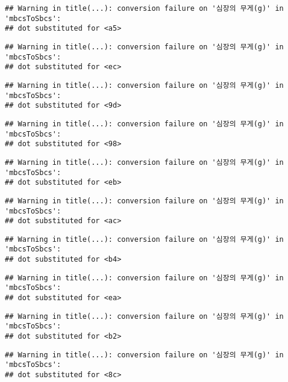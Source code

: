 \documentclass[
]{article}
\begin{document}
\begin{verbatim}
## Warning in title(...): conversion failure on '심장의 무게(g)' in 'mbcsToSbcs':
## dot substituted for <a5>
\end{verbatim}

\begin{verbatim}
## Warning in title(...): conversion failure on '심장의 무게(g)' in 'mbcsToSbcs':
## dot substituted for <ec>
\end{verbatim}

\begin{verbatim}
## Warning in title(...): conversion failure on '심장의 무게(g)' in 'mbcsToSbcs':
## dot substituted for <9d>
\end{verbatim}

\begin{verbatim}
## Warning in title(...): conversion failure on '심장의 무게(g)' in 'mbcsToSbcs':
## dot substituted for <98>
\end{verbatim}

\begin{verbatim}
## Warning in title(...): conversion failure on '심장의 무게(g)' in 'mbcsToSbcs':
## dot substituted for <eb>
\end{verbatim}

\begin{verbatim}
## Warning in title(...): conversion failure on '심장의 무게(g)' in 'mbcsToSbcs':
## dot substituted for <ac>
\end{verbatim}

\begin{verbatim}
## Warning in title(...): conversion failure on '심장의 무게(g)' in 'mbcsToSbcs':
## dot substituted for <b4>
\end{verbatim}

\begin{verbatim}
## Warning in title(...): conversion failure on '심장의 무게(g)' in 'mbcsToSbcs':
## dot substituted for <ea>
\end{verbatim}

\begin{verbatim}
## Warning in title(...): conversion failure on '심장의 무게(g)' in 'mbcsToSbcs':
## dot substituted for <b2>
\end{verbatim}

\begin{verbatim}
## Warning in title(...): conversion failure on '심장의 무게(g)' in 'mbcsToSbcs':
## dot substituted for <8c>
\end{verbatim}
\end{document}
